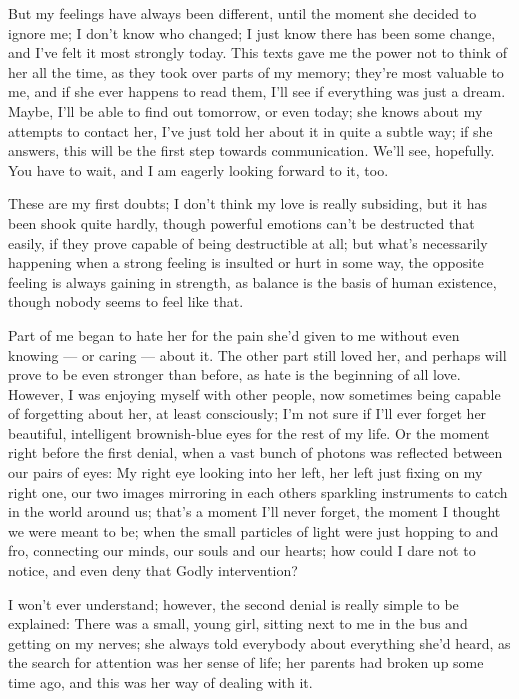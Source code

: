 But my feelings have always been different, until the moment she decided to ignore me; I don't know who changed; I just know there has been some change, and I've felt it most strongly today. This texts gave me the power not to think of her all the time, as they took over parts of my memory; they're most valuable to me, and if she ever happens to read them, I'll see if everything was just a dream. 
Maybe, I'll be able to find out tomorrow, or even today; she knows about my attempts to contact her, I've just told her about it in quite a subtle way; if she answers, this will be the first step towards communication.
We'll see, hopefully.
You have to wait, and I am eagerly looking forward to it, too.

These are my first doubts; I don't think my love is really subsiding, but it has been shook quite hardly, though powerful emotions can't be destructed that easily, if they prove capable of being destructible at all; but what's necessarily happening when a strong feeling is insulted or hurt in some way, the opposite feeling is always gaining in strength, as balance is the basis of human existence, though nobody seems to feel like that.

Part of me began to hate her for the pain she'd given to me without even knowing --- or caring --- about it. 
The other part still loved her, and perhaps will prove to be even stronger than before, as hate is the beginning of all love. 
However, I was enjoying myself with other people, now sometimes being capable of forgetting about her, at least consciously; I'm not sure if I'll ever forget her beautiful, intelligent brownish-blue eyes for the rest of my life.
Or the moment right before the first denial, when a vast bunch of photons was reflected between our pairs of eyes: My right eye looking into her left, her left just fixing on my right one, our two images mirroring in each others sparkling instruments to catch in the world around us; that's a moment I'll never forget, the moment I thought we were meant to be; when the small particles of light were just hopping to and fro, connecting our minds, our souls and our hearts; how could I dare not to notice, and even deny that Godly intervention?

I won't ever understand; however, the second denial is really simple to be explained: 
There was a small, young girl, sitting next to me in the bus and getting on my nerves; she always told everybody about everything she'd heard, as the search for attention was her sense of life; her parents had broken up some time ago, and this was her way of dealing with it.

